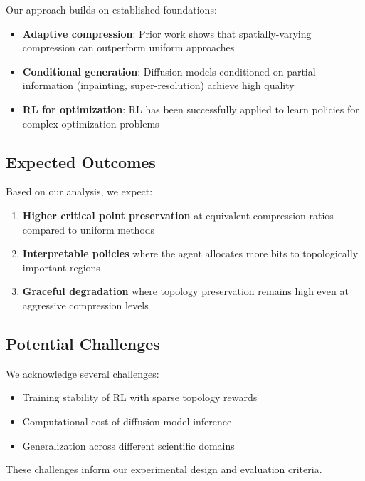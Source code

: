 Our approach builds on established foundations:

\begin{itemize}
    \item \textbf{Adaptive compression}: Prior work shows that spatially-varying compression can outperform uniform approaches
    \item \textbf{Conditional generation}: Diffusion models conditioned on partial information (inpainting, super-resolution) achieve high quality
    \item \textbf{RL for optimization}: RL has been successfully applied to learn policies for complex optimization problems
\end{itemize}

\subsection{Expected Outcomes}

Based on our analysis, we expect:

\begin{enumerate}
    \item \textbf{Higher critical point preservation} at equivalent compression ratios compared to uniform methods
    \item \textbf{Interpretable policies} where the agent allocates more bits to topologically important regions
    \item \textbf{Graceful degradation} where topology preservation remains high even at aggressive compression levels
\end{enumerate}

\subsection{Potential Challenges}

We acknowledge several challenges:

\begin{itemize}
    \item Training stability of RL with sparse topology rewards
    \item Computational cost of diffusion model inference
    \item Generalization across different scientific domains
\end{itemize}

These challenges inform our experimental design and evaluation criteria.
